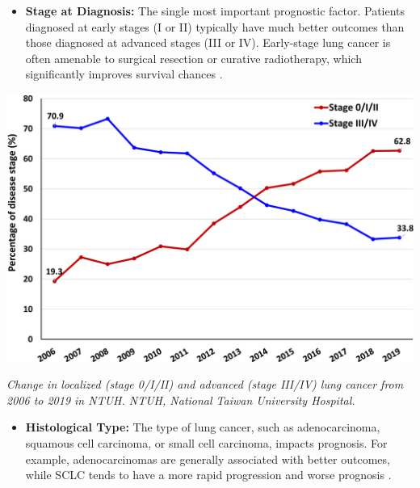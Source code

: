 \begin{itemize}
    \item \textbf{Stage at Diagnosis:} The single most important prognostic factor. Patients 
    diagnosed at early stages (I or II) typically have much better outcomes than those diagnosed at 
    advanced stages (III or IV). Early-stage lung cancer is often amenable to surgical resection or 
    curative radiotherapy, which significantly improves survival chances \cite{goldstaging}.
\end{itemize}

\vspace{1em}
\begin{center}
    \includegraphics[width=1.00\textwidth]{../assets/05-prognosis/stage-survival-rates.jpg}

    \small\textit{Change in localized (stage 0/I/II) and advanced (stage III/IV) lung cancer from 
    2006 to 2019 in NTUH. NTUH, National Taiwan University Hospital. \cite{osarogiagbon2023stage}}
\end{center}
\vspace{1em}

\begin{itemize}
    \item \textbf{Histological Type:} The type of lung cancer, such as adenocarcinoma, squamous cell 
    carcinoma, or small cell carcinoma, impacts prognosis. For example, adenocarcinomas are 
    generally associated with better outcomes, while SCLC tends to have a more rapid progression and 
    worse prognosis \cite{travis2015classification}.
\end{itemize}

